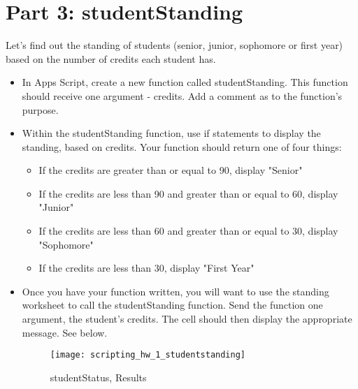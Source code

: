 \documentclass{article}
\begin{document}
\section*{Part 3: studentStanding}
Let's find out the standing of students (senior, junior, sophomore or first year) based on the number of credits each student has.
\begin{itemize}
	\item In Apps Script, create a new function called studentStanding.  This function should receive one argument - credits.  Add a comment as to the function's purpose.
	\item Within the studentStanding function, use if statements to display the standing, based on credits. Your function should return one of four things:
	\begin{itemize}
		\item If the credits are greater than or equal to 90, display "Senior"
		\item If the credits are less than 90 and  greater than or equal to 60, display "Junior"
		\item If the credits are less than 60 and greater than or equal to 30, display "Sophomore"
		\item If the credits are less than 30, display "First Year"
	\end{itemize}
	\item Once you have your function written, you will want to use the standing worksheet to call the studentStanding function.  Send the function one argument, the student's credits.  The cell should then display the appropriate message.  See below.
	\begin{figure}[H]
  \centering
  \texttt{[image: scripting\_hw\_1\_studentstanding]}
  \caption{studentStatus, Results}
\end{figure}
\end{itemize}
\end{document}
